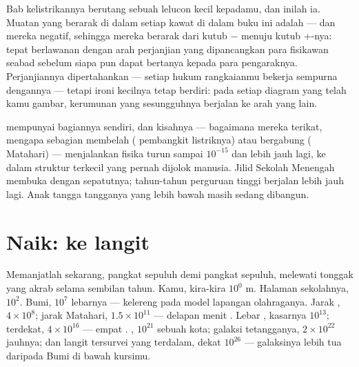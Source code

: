 \begin{example}\label{ex:g9:atoms-to-galaxies:electron}
Bab kelistrikannya berutang sebuah lelucon kecil kepadamu, dan inilah
ia. Muatan yang berarak di dalam setiap kawat di dalam buku ini adalah
\emph{} --- dan mereka negatif, sehingga mereka berarak dari
kutub $-$  menuju kutub $+$-nya: tepat berlawanan dengan arah
perjanjian yang dipancangkan para fisikawan seabad sebelum siapa pun
dapat bertanya kepada para pengaraknya. Perjanjiannya dipertahankan ---
setiap hukum rangkaianmu bekerja sempurna dengannya --- tetapi ironi
kecilnya tetap berdiri: pada setiap diagram yang telah kamu gambar,
kerumunan yang sesungguhnya berjalan ke arah yang lain.
\end{example}

\begin{example}\label{ex:g9:atoms-to-galaxies:deeper}
 mempunyai bagiannya sendiri, dan kisahnya --- bagaimana mereka
terikat, mengapa sebagian  membelah ( pembangkit listriknya)
atau bergabung ( Matahari) --- menjalankan fisika turun sampai
$10^{-15}$  dan lebih jauh lagi, ke dalam struktur terkecil yang
pernah dijolok manusia. Jilid Sekolah Menengah membuka  dengan
sepatutnya; tahun-tahun perguruan tinggi berjalan lebih jauh lagi. Anak
tangga tangganya yang lebih bawah masih sedang dibangun.
\end{example}

\section{Naik: ke langit}

\begin{example}[Pendakiannya]\label{ex:g9:atoms-to-galaxies:ascent}
Memanjatlah sekarang, pangkat sepuluh demi pangkat sepuluh, melewati
tonggak yang akrab selama sembilan tahun. Kamu, kira-kira $10^{0}$
\unit{m}. Halaman sekolahnya, $10^{2}$. Bumi, $10^{7}$ lebarnya ---
kelereng pada model lapangan olahraganya. Jarak ,
$4 \times 10^{8}$; jarak Matahari, $1.5 \times 10^{11}$ --- delapan
menit . Lebar , kasarnya $10^{13}$; 
terdekat, $4 \times 10^{16}$ --- empat . ,
$10^{21}$  sebuah kota; galaksi tetangganya, $2 \times 10^{22}$
jauhnya; dan langit tersurvei yang terdalam, dekat $10^{26}$  ---
 galaksinya lebih tua daripada Bumi di bawah kursimu.
\end{example}

